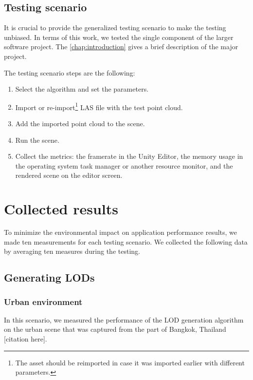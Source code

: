 \subsection{Testing scenario}

It is crucial to provide the generalized testing scenario to make the testing unbiased. In terms of this work, we tested the single component of the larger software project. The \autoref{chap:introduction} gives a brief description of the major project.

The testing scenario steps are the following:

\begin{enumerate}
    \item Select the algorithm and set the parameters.
    \item Import or re-import\footnote{The asset should be reimported in case it was imported earlier with different parameters.} LAS file with the test point cloud.
    \item Add the imported point cloud to the scene.
    \item Run the scene.
    \item Collect the metrics: the framerate in the Unity Editor, the memory usage in the operating system task manager or another resource monitor, and the rendered scene on the editor screen.
\end{enumerate}


\section{Collected results}

To minimize the environmental impact on application performance results, we made ten measurements for each testing scenario. We collected the following data by averaging ten measures during the testing.


\subsection{Generating LODs}

\subsubsection{Urban environment}

In this scenario, we measured the performance of the LOD generation algorithm on the urban scene that was captured from the part of Bangkok, Thailand [citation here].

